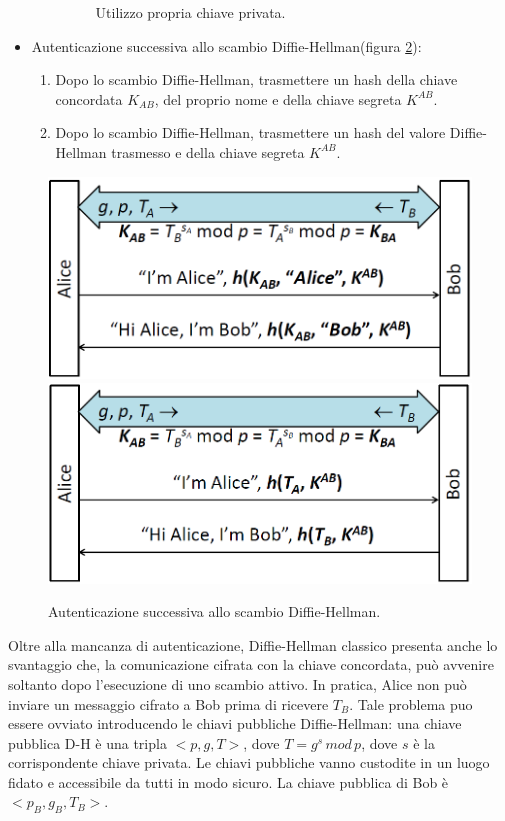 \begin{itemize}
\begin{enumerate}
\begin{figure}[htbp]
	\caption{Utilizzo propria chiave privata.}
	\label{fig:auth3}
	\end{figure}
\end{enumerate}
\item Autenticazione successiva allo scambio Diffie-Hellman(figura \ref{fig:auth45}):
\begin{enumerate}
\item Dopo lo scambio Diffie-Hellman, trasmettere un hash della chiave concordata $K_{AB}$, del proprio nome e della chiave segreta $K^{AB}$.
\item Dopo lo scambio Diffie-Hellman, trasmettere un hash del valore
Diffie-Hellman trasmesso e della chiave segreta $K^{AB}$.
\end{enumerate}
\end{itemize}
\begin{figure}[htbp]
	\centering
	\subfigure
	{\includegraphics[scale=0.5, keepaspectratio]{Immagini/chiave_pubblica/DiffieHellman_auth4.png}}
	\hspace{2mm}
	\subfigure
	{\includegraphics[scale=0.5, keepaspectratio]{Immagini/chiave_pubblica/DiffieHellman_auth5.png}}
	\caption{Autenticazione successiva allo scambio Diffie-Hellman.}
	\label{fig:auth45}
	\end{figure}

Oltre alla mancanza di autenticazione, Diffie-Hellman classico presenta anche lo svantaggio che, la comunicazione cifrata con la chiave concordata, può avvenire soltanto dopo l'esecuzione di uno scambio attivo. In pratica, Alice non può inviare un messaggio cifrato a Bob prima di ricevere $T_{B}$. Tale problema puo essere ovviato
introducendo le chiavi pubbliche Diffie-Hellman: una chiave pubblica D-H è una tripla $<p, g, T>$, dove $T = g^s \, mod \, p$, dove $s$ è la corrispondente chiave privata. Le chiavi pubbliche vanno custodite in un luogo fidato e accessibile da tutti in modo sicuro. La chiave pubblica di Bob è $<p_{B}, g_{B}, T_{B}>$. \\


